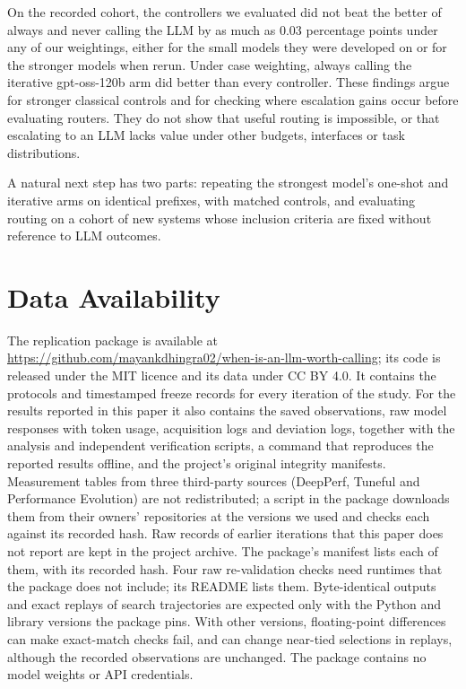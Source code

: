 On the recorded cohort, the controllers we evaluated did not beat the better of always and never calling the LLM by as much as 0.03 percentage points under any of our weightings, either for the small models they were developed on or for the stronger models when rerun. Under case weighting, always calling the iterative gpt-oss-120b arm did better than every controller. These findings argue for stronger classical controls and for checking where escalation gains occur before evaluating routers. They do not show that useful routing is impossible, or that escalating to an LLM lacks value under other budgets, interfaces or task distributions.

A natural next step has two parts: repeating the strongest model's one-shot and iterative arms on identical prefixes, with matched controls, and evaluating routing on a cohort of new systems whose inclusion criteria are fixed without reference to LLM outcomes.

\section*{Data Availability}

The replication package is available at \url{https://github.com/mayankdhingra02/when-is-an-llm-worth-calling}; its code is released under the MIT licence and its data under CC BY 4.0. It contains the protocols and timestamped freeze records for every iteration of the study. For the results reported in this paper it also contains the saved observations, raw model responses with token usage, acquisition logs and deviation logs, together with the analysis and independent verification scripts, a command that reproduces the reported results offline, and the project's original integrity manifests. Measurement tables from three third-party sources (DeepPerf, Tuneful and Performance Evolution) are not redistributed; a script in the package downloads them from their owners' repositories at the versions we used and checks each against its recorded hash. Raw records of earlier iterations that this paper does not report are kept in the project archive. The package's manifest lists each of them, with its recorded hash. Four raw re-validation checks need runtimes that the package does not include; its README lists them. Byte-identical outputs and exact replays of search trajectories are expected only with the Python and library versions the package pins. With other versions, floating-point differences can make exact-match checks fail, and can change near-tied selections in replays, although the recorded observations are unchanged. The package contains no model weights or API credentials.

